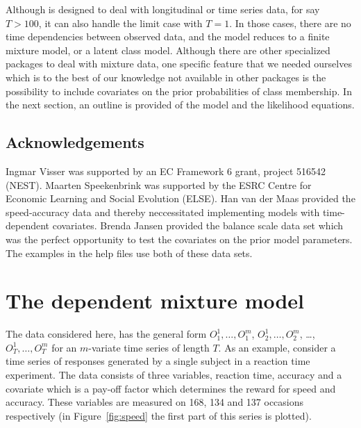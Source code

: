 \documentclass[article]{jss}
\begin{document}
Although  is designed to deal with
longitudinal or time series data, for say $T>100$, it can also handle
the limit case with $T=1$.  In those cases, there are no time
dependencies between observed data, and the model reduces to a finite
mixture model, or a latent class model.  Although there are other
specialized packages to deal with mixture data, one specific feature
that we needed ourselves which is to the best of our knowledge not
available in other packages is the possibility to include covariates
on the prior probabilities of class membership.  In the next section,
an outline is provided of the model and the likelihood equations.  


\subsection*{Acknowledgements} 

Ingmar Visser was supported by an EC Framework 6 grant, project 516542
(NEST).  Maarten Speekenbrink was supported by the ESRC Centre for
Economic Learning and Social Evolution (ELSE).  Han van der Maas
provided the speed-accuracy data \cite{Maas2005b} and thereby
neccessitated implementing models with time-dependent covariates.
Brenda Jansen provided the balance scale data set \citep{Jansen2001}
which was the perfect opportunity to test the covariates on the prior
model parameters.  The examples in the help files use both of these
data sets.


\section{The dependent mixture model}

The data considered here, has the general form $O_{1}^{1}, \ldots,
O_{1}^{m}$, $O_{2}^{1}, \ldots, O_{2}^{m}$, \ldots, $O_{T}^{1}, \ldots,
O_{T}^{m}$ for an $m$-variate time series of length $T$.  As an
example, consider a time series of responses generated by a single
subject in a reaction time experiment.  The data consists of three
variables, reaction time, accuracy and a covariate which is a pay-off
factor which determines the reward for speed and accuracy.  These
variables are measured on 168, 134 and 137 occasions respectively 
(in Figure~\ref{fig:speed} the first part of this series is plotted).
\end{document}
